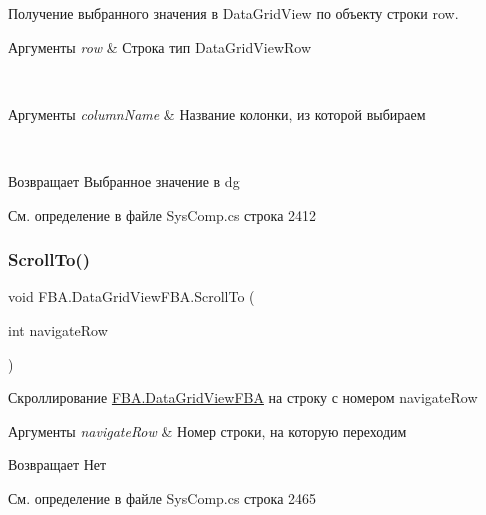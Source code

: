 Получение выбранного значения в Data\+Grid\+View по объекту строки row. 


\begin{DoxyParams}{Аргументы}
{\em row} & Строка тип Data\+Grid\+View\+Row\\
\hline
\end{DoxyParams}
~\newline

\begin{DoxyParams}{Аргументы}
{\em column\+Name} & Название колонки, из которой выбираем\\
\hline
\end{DoxyParams}
~\newline
\begin{DoxyReturn}{Возвращает}
Выбранное значение в dg
\end{DoxyReturn}


См. определение в файле Sys\+Comp.\+cs строка 2412

\mbox{\label{class_f_b_a_1_1_data_grid_view_f_b_a_ad9026c05a20b27cc91dd2849e071b446}} 
\subsubsection{\texorpdfstring{Scroll\+To()}{ScrollTo()}}
{\footnotesize\ttfamily void F\+B\+A.\+Data\+Grid\+View\+F\+B\+A.\+Scroll\+To (\begin{DoxyParamCaption}\item[{int}]{navigate\+Row }\end{DoxyParamCaption})}



Скроллирование \mbox{\hyperlink{class_f_b_a_1_1_data_grid_view_f_b_a}{F\+B\+A.\+Data\+Grid\+View\+F\+BA}} на строку с номером navigate\+Row 


\begin{DoxyParams}{Аргументы}
{\em navigate\+Row} & Номер строки, на которую переходим\\
\hline
\end{DoxyParams}
\begin{DoxyReturn}{Возвращает}
Нет
\end{DoxyReturn}


См. определение в файле Sys\+Comp.\+cs строка 2465

